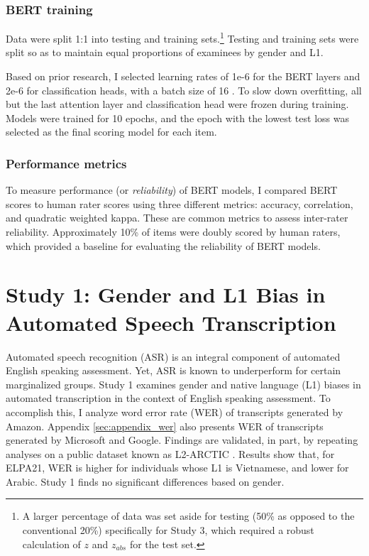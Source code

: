 \documentclass [PhD] {uclathes}
\begin{document}
\subsection{BERT training}

Data were split 1:1 into testing and training sets.\footnote{A larger percentage of data was set aside for testing (50\% as opposed to the conventional 20\%) specifically for Study 3, which required a robust calculation of $z$ and $z_{abs}$ for the test set.} Testing and training sets were split so as to maintain equal proportions of examinees by gender and L1. 

Based on prior research, I selected learning rates of 1e-6 for the BERT layers and 2e-6 for classification heads, with a batch size of 16 \citep{kwako2022using}. To slow down overfitting, all but the last attention layer and classification head were frozen during training. Models were trained for 10 epochs, and the epoch with the lowest test loss was selected as the final scoring model for each item. 

\subsection{Performance metrics}

To measure performance (or \emph{reliability}) of BERT models, I compared BERT scores to human rater scores using three different metrics: accuracy, correlation, and quadratic weighted kappa. These are common metrics to assess inter-rater reliability. Approximately 10\% of items were doubly scored by human raters, which provided a baseline for evaluating the reliability of BERT models.



\chapter{Study 1: Gender and L1 Bias in Automated Speech Transcription}
\label{study1}

Automated speech recognition (ASR) is an integral component of automated English speaking assessment. Yet, ASR is known to underperform for certain marginalized groups. Study 1 examines gender and native language (L1) biases in automated transcription in the context of English speaking assessment. To accomplish this, I analyze word error rate (WER) of transcripts generated by Amazon. Appendix \ref{sec:appendix_wer} also presents WER of transcripts generated by Microsoft and Google. Findings are validated, in part, by repeating analyses on a public dataset known as L2-ARCTIC \citep{zhao2018l2}. Results show that, for ELPA21, WER is higher for individuals whose L1 is Vietnamese, and lower for Arabic. Study 1 finds no significant differences based on gender.
\end{document}
